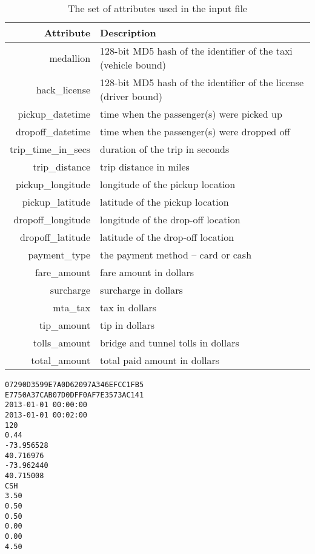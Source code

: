 \documentclass{sig-alternate}
\begin{document}
\begin{table}[ht]
	\caption{The set of attributes used in the input file}
	\centering 
	\begin{tabular}{r p{5.2cm}}
		\toprule
		Attribute		&	 Description\\
		\midrule
		medallion			&	128-bit MD5 hash of the identifier of the taxi (vehicle bound)\\[2ex]
		hack\_license		&	128-bit MD5 hash of the identifier of the license (driver bound)\\[2ex]
		pickup\_datetime		&	time when the passenger(s) were picked up\\[2ex]
		dropoff\_datetime	&  	time when the passenger(s) were dropped off\\[2ex]
		trip\_time\_in\_secs	&	duration of the trip in seconds\\[2ex]
		trip\_distance		&		trip distance in miles\\[2ex]
		pickup\_longitude	&	longitude of the pickup location\\[2ex]
		pickup\_latitude	&	latitude of the pickup location\\[2ex]
		dropoff\_longitude	&	longitude of the drop-off location\\[2ex]
		dropoff\_latitude	&	latitude of the drop-off location\\[2ex]
		payment\_type	&	the payment method -- card or cash\\[2ex]
		fare\_amount	&	fare amount in dollars\\[2ex]
		surcharge	&	surcharge in dollars\\[2ex]
		mta\_tax	&	tax in dollars\\[2ex]
		tip\_amount	&	tip in dollars\\[2ex]
		tolls\_amount	&	bridge and tunnel tolls in dollars\\[2ex]
		total\_amount	&	total paid amount in dollars\\
		
		\bottomrule 
	\end{tabular}
	\label{table:attr}
\end{table}

\lstset{}
\begin{lstlisting}[float=ht,caption={First line from data file -- one attribute per line of listing},label={code:line}]
07290D3599E7A0D62097A346EFCC1FB5
E7750A37CAB07D0DFF0AF7E3573AC141
2013-01-01 00:00:00
2013-01-01 00:02:00
120
0.44
-73.956528
40.716976
-73.962440
40.715008
CSH
3.50
0.50
0.50
0.00
0.00
4.50
\end{lstlisting}	
\end{document}
